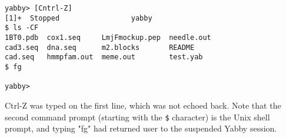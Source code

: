 \begin{verbatim}
yabby> [Cntrl-Z]
[1]+  Stopped                 yabby
$ ls -CF
1BT0.pdb  cox1.seq     LmjFmockup.pep  needle.out
cad3.seq  dna.seq      m2.blocks       README
cad.seq   hmmpfam.out  meme.out        test.yab
$ fg

yabby>
\end{verbatim}

Ctrl-Z was typed on the first line, which was not echoed back. Note
that the second command prompt (starting with the {\tt \$} character)
is the Unix shell prompt, and typing "fg" had returned user to
the suspended Yabby session.

